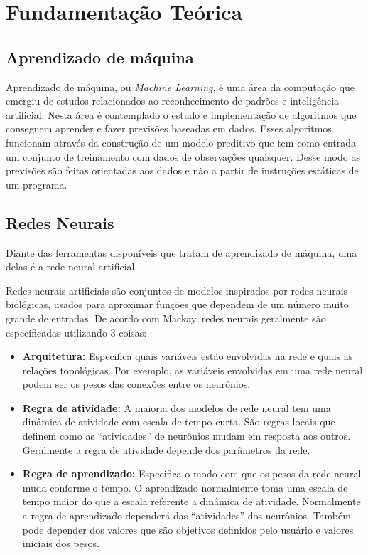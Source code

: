 \chapter{Fundamentação Teórica}

\section{Aprendizado de máquina}

Aprendizado de máquina, ou \textit{Machine Learning}, é uma área da
computação que emergiu de estudos relacionados ao reconhecimento de
padrões e inteligência artificial. Nesta área é contemplado o estudo e
implementação de algoritmos que conseguem aprender e fazer previsões
baseadas em dados. Esses algoritmos funcionam através da construção de
um modelo preditivo que tem como entrada um conjunto de treinamento
com dados de observações quaisquer. Desse modo as previsões são feitas
orientadas aos dados e não a partir de instruções estáticas de um
programa.

\section{Redes Neurais}

Diante das ferramentas disponíveis que tratam de aprendizado de
máquina, uma delas é a rede neural artificial.

Redes neurais artificiais são conjuntos de modelos inspirados por
redes neurais biológicas, usados para aproximar funções que dependem
de um número muito grande de entradas. De acordo com Mackay\cite{Mackay},
redes neurais geralmente são especificadas utilizando 3 coisas:

\begin{itemize}

\item {\bf Arquitetura:} Especifica quais variáveis estão envolvidas
  na rede e quais as relações topológicas. Por exemplo, as variáveis
  envolvidas em uma rede neural podem ser os pesos das conexões entre
  os neurônios.

\item {\bf Regra de atividade:} A maioria dos modelos de rede neural
  tem uma dinâmica de atividade com escala de tempo curta. São regras
  locais que definem como as ``atividades'' de neurônios mudam em
  resposta aos outros. Geralmente a regra de atividade depende dos
  parâmetros da rede.

\item {\bf Regra de aprendizado:} Especifica o modo com que os pesos
  da rede neural muda conforme o tempo. O aprendizado normalmente toma
  uma escala de tempo maior do que a escala referente a dinâmica de
  atividade. Normalmente a regra de aprendizado dependerá das
  ``atividades'' dos neurônios. Também pode depender dos valores
  que são objetivos definidos pelo usuário e valores iniciais dos
  pesos.

\end{itemize}

